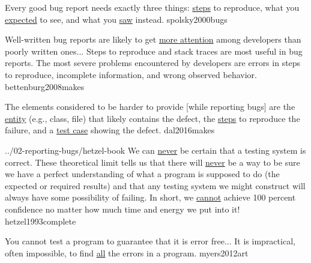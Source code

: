 \documentclass{article}
\begin{document}

  {Every good bug report needs exactly three things: \ul{steps} to reproduce, what you \ul{expected} to see, and what you \ul{saw} instead.}
  {spolsky2000bugs}

  {Well-written bug reports are likely to get \ul{more attention} among developers than poorly written ones... Steps to reproduce and stack traces are most useful in bug reports. The most severe problems encountered by developers are errors in steps to reproduce, incomplete information, and wrong observed behavior.}
  {bettenburg2008makes}

  {The elements considered to be harder to provide [while reporting bugs] are the \ul{entity} (e.g., class, file) that likely contains the defect, the \ul{steps} to reproduce the failure, and a \ul{test case} showing the defect.}
  {dal2016makes}


\qte
  {../02-reporting-bugs/hetzel-book}
  {We can \ul{never} be certain that a testing system is correct. These theoretical limit tells us that there will \ul{never} be a way to be sure we have a perfect understanding of what a program is supposed to do (the expected or required results) and that any testing system we might construct will always have some possibility of failing. In short, we \ul{cannot} achieve 100 percent confidence no matter how much time and energy we put into it!}
  {hetzel1993complete}

  {You cannot test a program to guarantee that it is error free... It is impractical, often impossible, to find \ul{all} the errors in a program.}
  {myers2012art}


\end{document}
